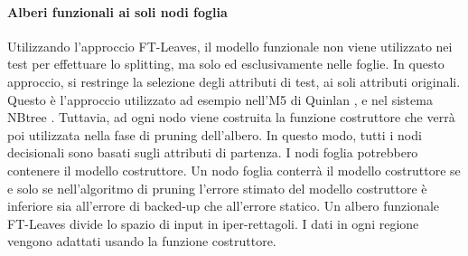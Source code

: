 \paragraph{Alberi funzionali ai soli nodi foglia}
\label{Alberi funzionali ai soli nodi foglia}
Utilizzando l'approccio FT-Leaves, il modello funzionale non viene utilizzato nei test per effettuare lo splitting, ma solo ed esclusivamente nelle foglie. In questo approccio, si restringe la selezione degli attributi di test, ai soli attributi originali.
Questo è l'approccio utilizzato ad esempio nell'M5 di Quinlan \cite{Quinlan93combininginstance-based}, e nel sistema NBtree \cite{Kohavi1996}. 
Tuttavia, ad ogni nodo viene costruita la funzione costruttore che verrà poi utilizzata nella fase di pruning dell'albero. In questo modo, tutti i nodi decisionali sono basati sugli attributi di partenza. I nodi foglia potrebbero contenere il modello costruttore. Un nodo foglia conterrà il modello costruttore se e solo se nell'algoritmo di pruning l'errore stimato del modello costruttore è inferiore sia all'errore di backed-up che all'errore statico. Un albero funzionale FT-Leaves divide lo spazio di input in iper-rettagoli. I dati in ogni regione vengono adattati usando la funzione costruttore.

